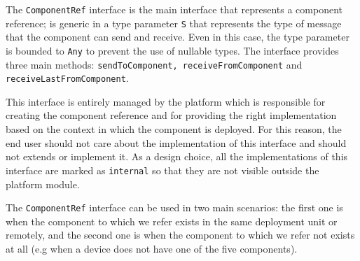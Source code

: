 The \texttt{ComponentRef} interface is the main interface that represents a component reference; is generic in a type parameter \texttt{S} that
represents the type of message that the component can send and receive. Even in this case, the type parameter is bounded to \texttt{Any} to prevent
the use of nullable types. The interface provides three main methods: \texttt{sendToComponent, receiveFromComponent} and
\texttt{receiveLastFromComponent}.

This interface is entirely managed by the platform which is responsible for creating the component reference and for providing the right
implementation based on the context in which the component is deployed. For this reason, the end user should not care about the implementation
of this interface and should not extends or implement it. As a design choice, all the implementations of this interface are marked as
\texttt{internal} so that they are not visible outside the platform module.

The \texttt{ComponentRef} interface can be used in two main scenarios: the first one is when the component to which we refer exists in the same
deployment unit or remotely, and the second one is when the component to which we refer not exists at all (e.g when a device does not have one of the
five components).




